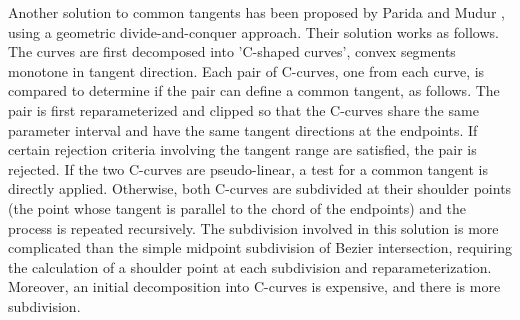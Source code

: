 \documentclass[10pt,twocolumn]{article}
\begin{document}



Another solution to common tangents has been proposed by 
Parida and Mudur \cite{parida95}, using a geometric divide-and-conquer approach.
Their solution works as follows.
The curves are first decomposed into 'C-shaped curves', convex segments
monotone in tangent direction.
Each pair of C-curves, one from each curve, is compared to determine
if the pair can define a common tangent, as follows.
The pair is first reparameterized and clipped so that the C-curves
share the same parameter interval and have the same tangent directions at the endpoints. 
If certain rejection criteria involving the tangent range are satisfied,
the pair is rejected.
If the two C-curves are pseudo-linear, a test for a common tangent is
directly applied.
Otherwise, both C-curves are subdivided at their shoulder points (the point
whose tangent is parallel to the chord of the endpoints) and the process
is repeated recursively.
The subdivision involved in this solution is more complicated than the
simple midpoint subdivision of Bezier intersection,
requiring the calculation of a shoulder point at each subdivision
and reparameterization.
Moreover, an initial decomposition into C-curves is expensive, and 
there is more subdivision.

\end{document}
